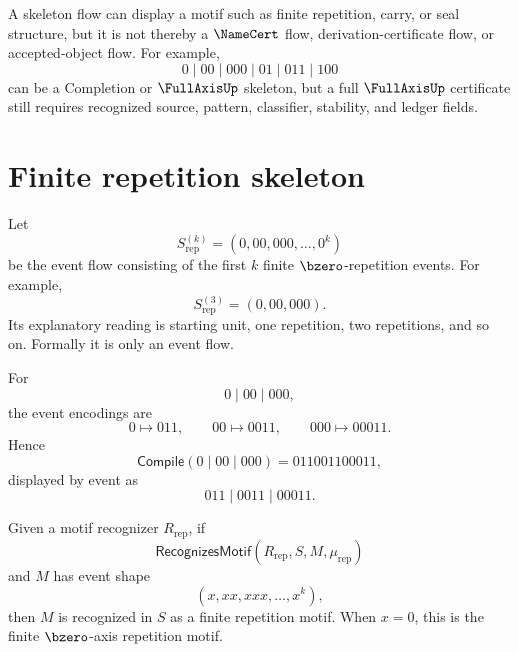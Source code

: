 \begin{remark}
\label{rem:case-studies-skeleton-weaker-than-cert}
A skeleton flow can display a motif such as finite repetition, carry, or seal structure, but it is not thereby a $\NameCert$ flow, derivation-certificate flow, or accepted-object flow. For example,
$$
  0\mid 00\mid 000\mid 01\mid 011\mid 100
$$
can be a Completion or $\FullAxisUp$ skeleton, but a full $\FullAxisUp$ certificate still requires recognized source, pattern, classifier, stability, and ledger fields.
\end{remark}

\section{Finite repetition skeleton}
\label{sec:case-studies-finite-repetition}

\begin{definition}
\label{def:case-studies-finite-repetition-skeleton}
Let
$$
  S_{\mathrm{rep}}^{(k)}
  =
  (0,00,000,\ldots,0^k)
$$
be the event flow consisting of the first $k$ finite $\bzero$-repetition events. For example,
$$
  S_{\mathrm{rep}}^{(3)}=(0,00,000).
$$
Its explanatory reading is starting unit, one repetition, two repetitions, and so on. Formally it is only an event flow.
\end{definition}

\begin{example}
\label{ex:case-studies-finite-repetition-code}
For
$$
  0\mid 00\mid 000,
$$
the event encodings are
$$
  0\mapsto 011,\qquad
  00\mapsto 0011,\qquad
  000\mapsto 00011.
$$
Hence
$$
  \mathsf{Compile}(0\mid 00\mid 000)
  =
  011001100011,
$$
displayed by event as
$$
  011\mid 0011\mid 00011.
$$
\end{example}

\begin{definition}
\label{def:case-studies-finite-repetition-motif}
Given a motif recognizer $R_{\mathrm{rep}}$, if
$$
  \mathsf{RecognizesMotif}(R_{\mathrm{rep}},S,M,\mu_{\mathrm{rep}})
$$
and $M$ has event shape
$$
  (x,xx,xxx,\ldots,x^k),
$$
then $M$ is recognized in $S$ as a finite repetition motif. When $x=0$, this is the finite $\bzero$-axis repetition motif.
\end{definition}

